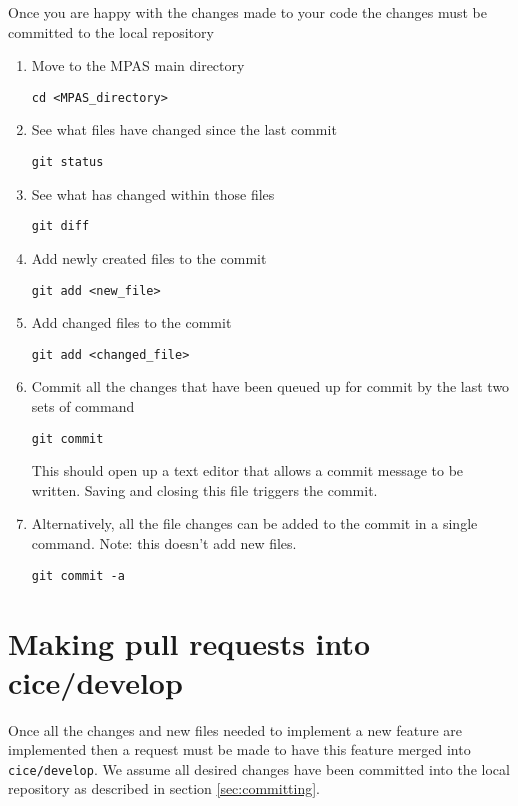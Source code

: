 \documentclass{article}
\begin{document}
Once you are happy with the changes made to your code the changes must be committed to the local repository

\begin{enumerate}

\item Move to the MPAS main directory

\verb+cd <MPAS_directory>+

\item See what files have changed since the last commit

\verb+git status+

\item See what has changed within those files

\verb+git diff+

\item Add newly created files to the commit

\verb+git add <new_file>+

\item Add changed files to the commit

\verb+git add <changed_file>+

\item Commit all the changes that have been queued up for commit by the last two sets of command

\verb+git commit+

This should open up a text editor that allows a commit message to be written. Saving and closing this file triggers the commit.

\item Alternatively, all the file changes can be added to the commit in a single command. Note: this doesn't add new files.

\verb+git commit -a+


\end{enumerate}


\section{Making pull requests into cice/develop}
\label{sec:pull_request}

Once all the changes and new files needed to implement a new feature are implemented then a request must be made to have this feature merged into \verb+cice/develop+. We assume all desired changes have been committed into the local repository as described in section \ref{sec:committing}.
\end{document}
